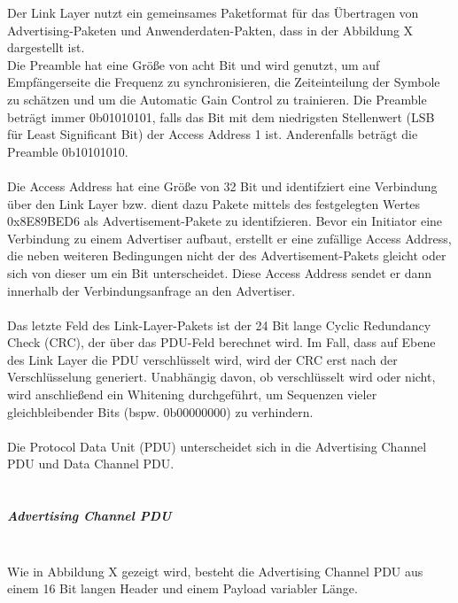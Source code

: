 Der Link Layer nutzt ein gemeinsames Paketformat für das Übertragen von Advertising-Paketen und Anwenderdaten-Pakten, dass in der Abbildung X
dargestellt ist.\\

Die Preamble hat eine Größe von acht Bit und wird genutzt, um auf Empfängerseite die Frequenz zu synchronisieren, die Zeiteinteilung der Symbole zu schätzen und um die Automatic Gain Control zu trainieren. Die Preamble beträgt immer 0b01010101, falls das Bit mit dem niedrigsten Stellenwert (LSB für Least Significant Bit) der Access Address 1 ist. Anderenfalls beträgt die Preamble 0b10101010.
\\\\
Die Access Address hat eine Größe von 32 Bit und identifziert eine Verbindung über den Link Layer bzw. dient dazu Pakete mittels des festgelegten Wertes 0x8E89BED6 als Advertisement-Pakete zu identifzieren. Bevor ein Initiator eine Verbindung zu einem Advertiser aufbaut, erstellt er eine zufällige Access Address, die neben weiteren Bedingungen nicht der des Advertisement-Pakets gleicht oder sich von dieser um ein Bit unterscheidet. Diese Access Address sendet er dann innerhalb der Verbindungsanfrage an den Advertiser.
\\\\
Das letzte Feld des Link-Layer-Pakets ist der 24 Bit lange Cyclic Redundancy Check (CRC), der über das PDU-Feld berechnet wird. Im Fall, dass auf Ebene des Link Layer die PDU verschlüsselt wird, wird der CRC erst nach der Verschlüsselung generiert. Unabhängig davon, ob verschlüsselt wird oder nicht, wird anschließend ein Whitening durchgeführt, um Sequenzen vieler gleichbleibender Bits (bspw. 0b00000000) zu verhindern.
\\\\
Die Protocol Data Unit (PDU) unterscheidet sich in die Advertising Channel PDU und Data Channel PDU.
\\\\

\subparagraph{Advertising Channel PDU} \mbox{} \vspace{0.2cm} \\
Wie in Abbildung X 
gezeigt wird, besteht die Advertising Channel PDU aus einem 16 Bit langen Header und einem Payload variabler Länge.

